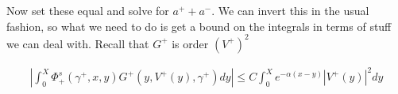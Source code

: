 \documentclass[12pt]{article}
\begin{document}
Now set these equal and solve for $a^+ + a^-$. We can invert this in the usual fashion, so what we need to do is get a bound on the integrals in terms of stuff we can deal with. Recall that $G^+$ is order $(V^+)^2$

\begin{align*}
\left| \int_0^X \Phi_+^s(\gamma^+, x, y) G^+(y, V^+(y),\gamma^+)dy \right| 
\leq C \int_0^X e^{-\alpha(x-y)} |V^+(y)|^2 dy
\end{align*}
\end{document}
